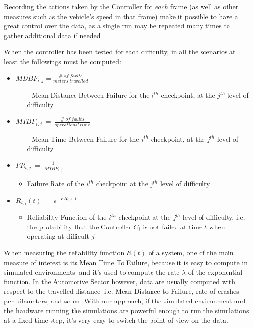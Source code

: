 Recording the actions taken by the Controller for \textsl{each} frame (as well as other measures such as the vehicle's speed in that frame) make it possible to have a great control over the data, as a single run may be repeated many times to gather additional data if needed.

When the controller has been tested for each difficulty, in all the scenarios at least the followings must be computed:

\begin{itemize}
	\item $MDBF_{i,j} = \frac{\#\: of\: faults}{meters\: travelled}$
	\begin{itemize}
		\item[-] Mean Distance Between Failure for the $i^{th}$ checkpoint, at the $j^{th}$ level of difficulty
	\end{itemize}
	\item $MTBF_{i,j}\: =\: \frac{\#\: of\: faults}{operational\: time}$
		\begin{itemize}
		\item[-] Mean Time Between Failure for the $i^{th}$ checkpoint, at the $j^{th}$ level of difficulty
	\end{itemize}
	\item $FR_{i,j}\: =\: \frac{1}{MTBF_{i,j}}$
	\begin{itemize}
		\item Failure Rate of the $i^{th}$ checkpoint at the $j^{th}$ level of difficulty
	\end{itemize}
	\item $R_{i,j}(t)\: =\: e^{-FR_{i,j}\cdot t}$
	\begin{itemize}
		\item Reliability Function of the $i^{th}$ checkpoint at the $j^{th}$ level of difficulty, i.e. the probability that the Controller $C_{i}$ is not failed at time $t$ when operating at difficult $j$
	\end{itemize}
	
\end{itemize}

When measuring the reliability function $R(t)$ of a system, one of the main measure of interest is its Mean Time To Failure, because it is easy to compute in simulated environments, and it's used to compute the rate $\lambda$ of the exponential function.
In the Automotive Sector however, data are usually computed with respect to the travelled distance, i.e. Mean Distance to Failure, rate of crashes per kilometers, and so on.
With our approach, if the simulated environment and the hardware running the simulations are powerful enough to run the simulations at a fixed time-step, it's very easy to switch the point of view on the data.

